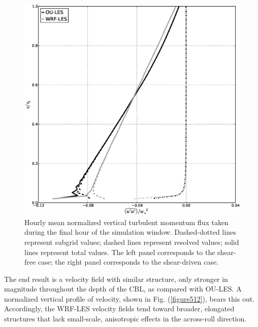 \begin{figure}[!ht]
\begin{center}
\includegraphics[width=\textwidth]{figures/chapter5/stress13}
\end{center}
\caption{Hourly mean normalized vertical turbulent momentum flux taken during the final hour of the simulation window. Dashed-dotted lines represent subgrid values; dashed lines represent resolved values; solid lines represent total values. The left panel corresponds to the shear-free case; the right panel corresponds to the shear-driven case.}
\label{figure511}
\end{figure}


The end result is a velocity field with similar structure, only stronger in magnitude throughout the depth of the CBL, as compared with OU-LES. A normalized vertical profile of velocity, shown in Fig. (\autoref{figure512}), bears this out. Accordingly, the WRF-LES velocity fields tend toward broader, elongated structures that lack small-scale, anisotropic effects in the across-roll direction.


